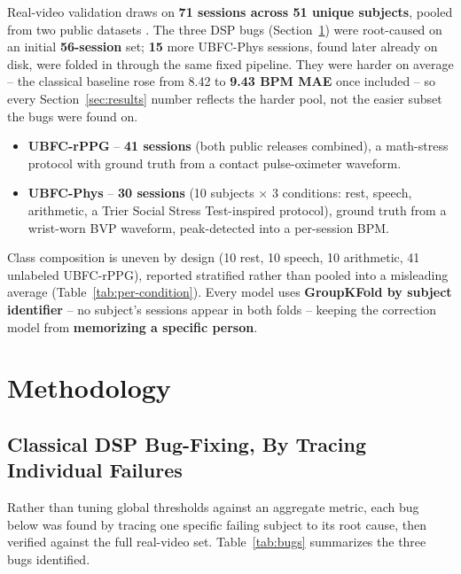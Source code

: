 \documentclass[conference]{IEEEtran}
\begin{document}
Real-video validation draws on \textbf{71 sessions across 51 unique subjects}, pooled from two public datasets \cite{b_ubfc_rppg, b_ubfc_phys}. The three DSP bugs (Section~\ref{sec:methodology}) were root-caused on an initial \textbf{56-session} set; \textbf{15} more UBFC-Phys sessions, found later already on disk, were folded in through the same fixed pipeline. They were harder on average -- the classical baseline rose from 8.42 to \textbf{9.43 BPM MAE} once included -- so every Section~\ref{sec:results} number reflects the harder pool, not the easier subset the bugs were found on.
\begin{itemize}
    \item \textbf{UBFC-rPPG} \cite{b_ubfc_rppg} -- \textbf{41 sessions} (both public releases combined), a math-stress protocol with ground truth from a contact pulse-oximeter waveform.
    \item \textbf{UBFC-Phys} \cite{b_ubfc_phys} -- \textbf{30 sessions} (10 subjects $\times$ 3 conditions: rest, speech, arithmetic, a Trier Social Stress Test-inspired protocol), ground truth from a wrist-worn BVP waveform, peak-detected into a per-session BPM.
\end{itemize}
Class composition is uneven by design (10 rest, 10 speech, 10 arithmetic, 41 unlabeled UBFC-rPPG), reported stratified rather than pooled into a misleading average (Table~\ref{tab:per-condition}). Every model uses \textbf{GroupKFold by subject identifier} -- no subject's sessions appear in both folds -- keeping the correction model from \textbf{memorizing a specific person}.

\section{\textbf{Methodology}}
\label{sec:methodology}

\subsection{\textbf{Classical DSP Bug-Fixing, By Tracing Individual Failures}}
Rather than tuning global thresholds against an aggregate metric, each bug below was found by tracing one specific failing subject to its root cause, then verified against the full real-video set. Table~\ref{tab:bugs} summarizes the three bugs identified.
\end{document}
